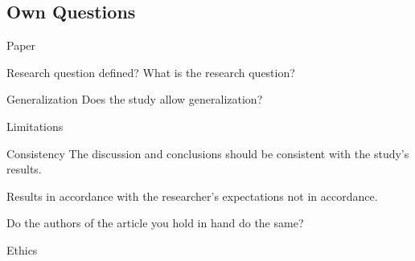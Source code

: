 \documentclass[presentation]{beamer}
\begin{document}
\subsection{Own Questions}
\label{sec:org93ecb09}
\begin{frame}[label={sec:orgd8abcd8}]{Paper}
\end{frame}

\begin{frame}[label={sec:org66733af}]{Research question defined?}
What is the research question?
\end{frame}

\begin{frame}[label={sec:org7790d67}]{Generalization}
Does the study allow generalization?
\end{frame}
\begin{frame}[label={sec:org51fb7a1}]{Limitations}
\end{frame}



\begin{frame}[label={sec:orgf523bef}]{Consistency}
The discussion and conclusions should be consistent with the study’s results.

Results
in accordance with the researcher’s expectations
not in accordance.

Do the authors of the article you hold in hand do the same?
\end{frame}

\begin{frame}[label={sec:org4ac1ae9}]{Ethics}
\end{frame}
\end{document}
